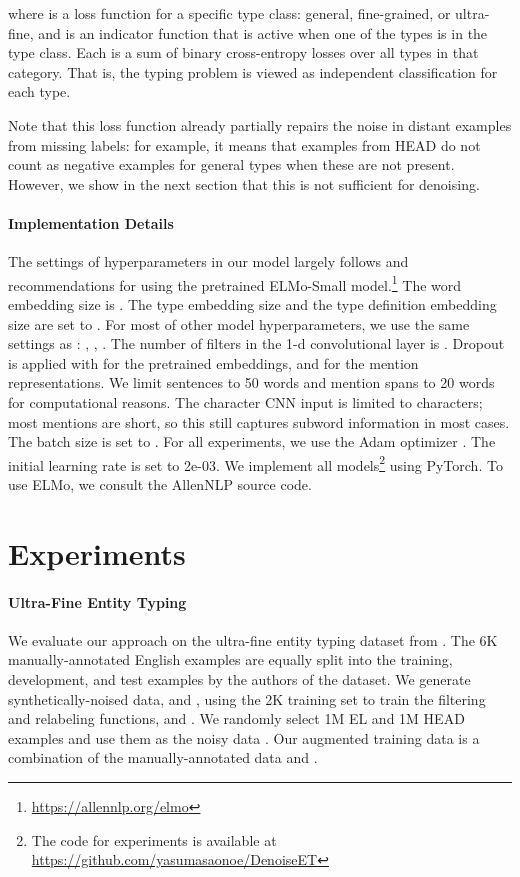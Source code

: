 \documentclass[11pt,a4paper]{article}
\begin{document}
where  is a loss function for a specific type class: general, fine-grained, or ultra-fine, and  is an indicator function that is active when one of the types  is in the type class. Each  is a sum of binary cross-entropy losses over all types in that category. That is, the typing problem is viewed as independent classification for each type.

Note that this loss function already partially repairs the noise in distant examples from missing labels: for example, it means that examples from HEAD do not count as negative examples for general types when these are not present. However, we show in the next section that this is not sufficient for denoising.

\vspace{-4pt}
\paragraph{Implementation Details} The settings of hyperparameters in our model largely follows \citet{Eunsol_Choi_18} and recommendations for using the pretrained ELMo-Small model.\footnote{\url{https://allennlp.org/elmo}} The word embedding size  is . The type embedding size and the type definition embedding size are set to . For most of other model hyperparameters, we use the same settings as \citet{Eunsol_Choi_18}: , , .
The number of filters in the 1-d convolutional layer is . Dropout is applied with  for the pretrained embeddings, and  for the mention representations. We limit sentences to 50 words and mention spans to 20 words for computational reasons. The character CNN input is limited to  characters; most mentions are short, so this still captures subword information in most cases. The batch size is set to . For all experiments, we use the Adam optimizer \cite{Kingma_14}. The initial learning rate is set to 2e-03. We implement all models\footnote{The code for experiments is available at \url{https://github.com/yasumasaonoe/DenoiseET}} using PyTorch. To use ELMo, we consult the AllenNLP source code. 





\section{Experiments}\label{experiments}

\paragraph{Ultra-Fine Entity Typing}
We evaluate our approach on the ultra-fine entity typing dataset from \citet{Eunsol_Choi_18}.  The 6K manually-annotated English examples are equally split into the training, development, and test examples by the authors of the dataset. We generate synthetically-noised data,  and , using the 2K training set to train the filtering and relabeling functions,  and . We randomly select 1M EL and 1M HEAD examples and use them as the noisy data . Our augmented training data is a combination of the manually-annotated data  and . 
\end{document}
